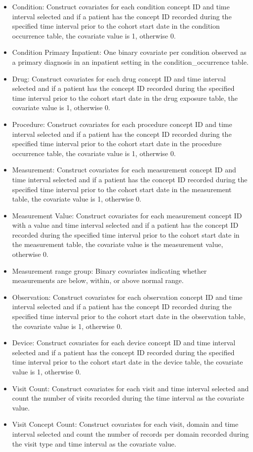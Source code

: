 \documentclass[11pt]{book}
\providecommand{\tightlist}{%
  \setlength{\itemsep}{0pt}\setlength{\parskip}{0pt}}
\theoremstyle{definition}
\theoremstyle{definition}
\theoremstyle{definition}
\theoremstyle{remark}
\begin{document}
\begin{itemize}
\tightlist
\item
  Condition: Construct covariates for each condition concept ID and time
  interval selected and if a patient has the concept ID recorded during
  the specified time interval prior to the cohort start date in the
  condition occurrence table, the covariate value is 1, otherwise 0.
\item
  Condition Primary Inpatient: One binary covariate per condition
  observed as a primary diagnosis in an inpatient setting in the
  condition\_occurrence table.
\item
  Drug: Construct covariates for each drug concept ID and time interval
  selected and if a patient has the concept ID recorded during the
  specified time interval prior to the cohort start date in the drug
  exposure table, the covariate value is 1, otherwise 0.
\item
  Procedure: Construct covariates for each procedure concept ID and time
  interval selected and if a patient has the concept ID recorded during
  the specified time interval prior to the cohort start date in the
  procedure occurrence table, the covariate value is 1, otherwise 0.
\item
  Measurement: Construct covariates for each measurement concept ID and
  time interval selected and if a patient has the concept ID recorded
  during the specified time interval prior to the cohort start date in
  the measurement table, the covariate value is 1, otherwise 0.
\item
  Measurement Value: Construct covariates for each measurement concept
  ID with a value and time interval selected and if a patient has the
  concept ID recorded during the specified time interval prior to the
  cohort start date in the measurement table, the covariate value is the
  measurement value, otherwise 0.
\item
  Measurement range group: Binary covariates indicating whether
  measurements are below, within, or above normal range.
\item
  Observation: Construct covariates for each observation concept ID and
  time interval selected and if a patient has the concept ID recorded
  during the specified time interval prior to the cohort start date in
  the observation table, the covariate value is 1, otherwise 0.
\item
  Device: Construct covariates for each device concept ID and time
  interval selected and if a patient has the concept ID recorded during
  the specified time interval prior to the cohort start date in the
  device table, the covariate value is 1, otherwise 0.
\item
  Visit Count: Construct covariates for each visit and time interval
  selected and count the number of visits recorded during the time
  interval as the covariate value.
\item
  Visit Concept Count: Construct covariates for each visit, domain and
  time interval selected and count the number of records per domain
  recorded during the visit type and time interval as the covariate
  value.
\end{itemize}
\end{document}
